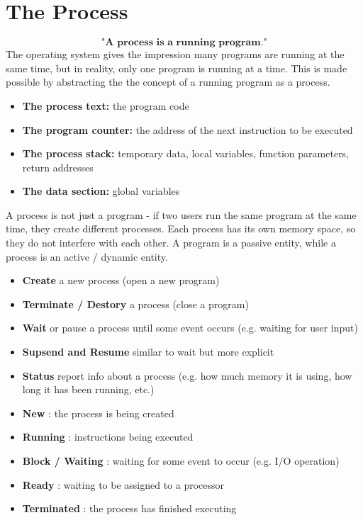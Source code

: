 \documentclass[a4paper, 10pt]{article}
\begin{document}
\section{The Process}
$$\textbf{"A process is a running program."}$$
The operating system gives the impression many programs are running at the same time, but in reality, only one program is running at a time. This is made possible by abstracting the the concept of a running program as a process.
\begin{conceptbox}
    \begin{itemize}
        \item \textbf{The process text:} the program code
        \item \textbf{The program counter:} the address of the next instruction to be executed
        \item \textbf{The process stack:}  temporary data, local variables, function parameters, return addresses
        \item \textbf{The data section:}  global variables
    \end{itemize}
\end{conceptbox}
A process is not just a program - if two users run the same program at the same time, they create different processes. Each process has its own memory space, so they do not interfere with each other. A program is a passive entity, while a process is an active / dynamic entity.
\begin{conceptbox}
    \begin{itemize}
        \item \textbf{Create} a new process (open a new program)
        \item \textbf{Terminate / Destory} a process (close a program)
        \item \textbf{Wait} or pause a process until some event occurs (e.g. waiting for user input)
        \item \textbf{Supsend and Resume} similar to wait but more explicit
        \item \textbf{Status}  report info about a process (e.g. how much memory it is using, how long it has been running, etc.)
    \end{itemize}
\end{conceptbox}
\begin{conceptbox}
    \begin{itemize}
        \item \textbf{New} : the process is being created
        \item \textbf{Running} : instructions being executed
        \item \textbf{Block / Waiting} : waiting for some event to occur (e.g. I/O operation)
        \item \textbf{Ready} : waiting to be assigned to a processor
        \item \textbf{Terminated} : the process has finished executing
    \end{itemize}
\end{conceptbox}
\end{document}
